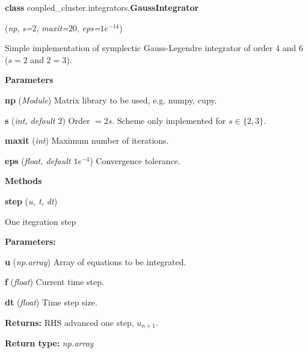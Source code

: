 \begin{tcolorbox}
    {\selectfont
    \textbf{class} coupled\_cluster.integrators.\textbf{GaussIntegrator}

    \hspace{1em}(\emph{np}, \emph{s=$2$}, \emph{maxit=$20$}, \emph{eps=$1e^{-14}$})

    \vspace{1em}
    Simple implementation of symplectic Gauss-Legendre integrator
    of order $4$ and $6$ ($s=2$ and $2=3$).
    
    \vspace{1em}
    \textbf{Parameters}

    \hspace{2em} \textbf{np} (\emph{Module})
        Matrix library to be used, e.g. numpy, cupy.

    \hspace{2em} \textbf{s} (\emph{int, default $2$})
        Order $= 2s$. Scheme only implemented for $s\in\{2, 3\}$.

    \hspace{2em} \textbf{maxit} (\emph{int})
        Maximum number of iterations.

    \hspace{2em} \textbf{eps} (\emph{float, default $1e^{-4}$})
        Convergence tolerance.

    \vspace{1em} 
    \textbf{Methods}

    \hspace{2em} \textbf{step} (\emph{u, t, dt})

        \begin{adjustwidth}{4em}{}
        One itegration step

        \textbf{Parameters:} 
        
            \hspace{1.5em} \textbf{u} (\emph{np.array}) Array of equations to be integrated.

            \hspace{1.5em} \textbf{f} (\emph{float}) Current time step.

            \hspace{1.5em} \textbf{dt} (\emph{float}) Time step size.

        \textbf{Returns:} RHS advanced one step, $u_{n+1}$.
        
        \textbf{Return type:} \emph{np.array}

        \end{adjustwidth}

}
\end{tcolorbox}

